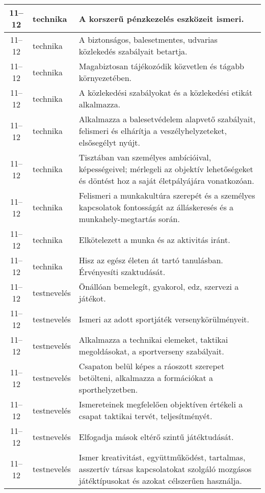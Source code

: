\begin{small}
\begin{longtable}{c | p{2cm} |  p{11cm} }
              11--12 & technika & A korszerű pénzkezelés eszközeit ismeri. \\ \hline
              11--12 & technika & A biztonságos, balesetmentes, udvarias közlekedés szabályait betartja. \\ \hline
              11--12 & technika & Magabiztosan tájékozódik közvetlen és tágabb környezetében. \\ \hline
              11--12 & technika & A közlekedési szabályokat és a közlekedési etikát alkalmazza. \\ \hline
              11--12 & technika & Alkalmazza a balesetvédelem alapvető szabályait, felismeri és elhárítja a veszélyhelyzeteket, elsősegélyt nyújt. \\ \hline
              11--12 & technika & Tisztában van személyes ambícióival, képességeivel; mérlegeli az objektív lehetőségeket és döntést hoz a saját életpályájára vonatkozóan. \\ \hline
              11--12 & technika & Felismeri a munkakultúra szerepét és a személyes kapcsolatok fontosságát az álláskeresés és a munkahely-megtartás során. \\ \hline
              11--12 & technika & Elkötelezett a munka és az aktivitás iránt. \\ \hline
              11--12 & technika & Hisz az egész életen át tartó tanulásban. Érvényesíti szaktudását. \\ \hline
              11--12 & testnevelés & Önállóan bemelegít, gyakorol, edz, szervezi a játékot. \\ \hline
              11--12 & testnevelés & Ismeri az adott sportjáték versenykörülményeit. \\ \hline
              11--12 & testnevelés & Alkalmazza a technikai elemeket, taktikai megoldásokat, a sportverseny szabályait. \\ \hline
              11--12 & testnevelés & Csapaton belül képes a ráoszott szerepet betölteni, alkalmazza a formációkat a sporthelyzetben. \\ \hline
              11--12 & testnevelés & Ismereteinek megfelelően objektíven értékeli a csapat taktikai tervét, teljesítményét. \\ \hline
              11--12 & testnevelés & Elfogadja mások eltérő szintű játéktudását. \\ \hline
              11--12 & testnevelés & Ismer kreativitást, együttműködést, tartalmas, asszertív társas kapcsolatokat szolgáló mozgásos játéktípusokat és azokat célszerűen használja. \\ \hline

\end{longtable}
\end{small}
